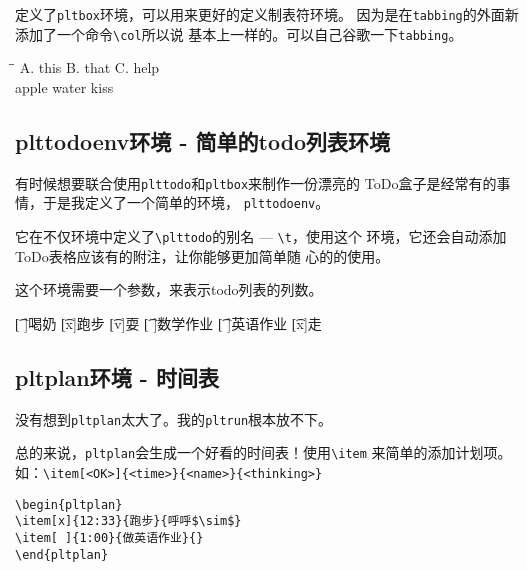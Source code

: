 \documentclass{peterlitsdoc}
\newcommand{\vb}{\verb}
\begin{document}
定义了\vb|pltbox|环境，可以用来更好的定义制表符环境。
因为是在\vb|tabbing|的外面新添加了一个命令\vb|\col|所以说
基本上一样的。可以自己谷歌一下\vb|tabbing|。

\begin{pltrun}
\begin{pltbox}
\=\=\kill
A. this   \>B. that   \>C. help   \\
\plttodo[ ]apple                  \>
\plttodo[x]water                  \>
\plttodo[ ]kiss                   \\
\end{pltbox}
\end{pltrun}



\subsection{plttodoenv环境 - 简单的todo列表环境}

有时候想要联合使用\vb|plttodo|和\vb|pltbox|来制作一份漂亮的
ToDo盒子是经常有的事情，于是我定义了一个简单的环境，
\vb|plttodoenv|。

它在不仅环境中定义了\vb|\plttodo|的别名 --- \vb|\t|，使用这个
环境，它还会自动添加ToDo表格应该有的附注，让你能够更加简单随
心的的使用。

这个环境需要一个参数，来表示todo列表的列数。

\begin{pltrun}
\begin{plttodoenv}{2}
\t[ ]喝奶     \t[x]跑步     \t[v]耍
\t[ ]数学作业 \t[ ]英语作业 \t[x]走
\end{plttodoenv}
\end{pltrun}



\subsection{pltplan环境 - 时间表}

没有想到\vb|pltplan|太大了。我的\vb|pltrun|根本放不下。

总的来说，\vb|pltplan|会生成一个好看的时间表！使用\vb|\item|
来简单的添加计划项。如：\vb|\item[<OK>]{<time>}{<name>}{<thinking>}|

\begin{lstlisting}
\begin{pltplan}
\item[x]{12:33}{跑步}{呼呼$\sim$}
\item[ ]{1:00}{做英语作业}{}
\end{pltplan}
\end{lstlisting}
\end{document}
